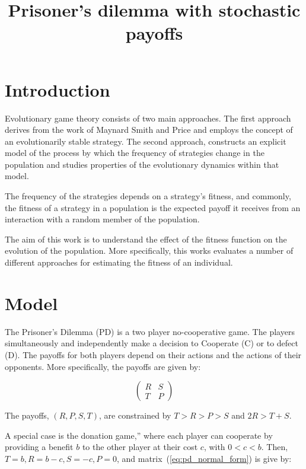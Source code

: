 \documentclass[11pt]{article}
\title{\begin{center}
\bf  \sffamily \LARGE Prisoner's dilemma with stochastic payoffs\\[-1cm]
\end{center}}
\date{}
\author{}
\theoremstyle{plainCl1}
\theoremstyle{plainCl2}
\begin{document}
\maketitle

\section{Introduction}

Evolutionary game theory consists of two main approaches. The first approach
derives from the work of Maynard Smith and Price and employs the concept of an
evolutionarily stable strategy. The second approach, constructs an explicit
model of the process by which the frequency of strategies change in the
population and studies properties of the evolutionary dynamics within that
model.

The frequency of the strategies depends on a strategy's fitness, and commonly,
the fitness of a strategy in a population is the expected payoff it receives
from an interaction with a random member of the population.

The aim of this work is to understand the effect of the fitness function on the
evolution of the population. More specifically, this works evaluates a number of
different approaches for estimating the fitness of an individual.

\section{Model}

The Prisoner's Dilemma (PD) is a two player no-cooperative game. The players
simultaneously and independently make a decision to Cooperate (C) or to defect
(D). The payoffs for both players depend on their actions and the actions of
their opponents. More specifically, the payoffs are given by:

\begin{equation}\label{eq:pd_normal_form}
    \begin{pmatrix}
        R & S  \\
        T & P
    \end{pmatrix}
\end{equation}

The payoffs, \((R, P, S, T)\), are constrained by \(T > R > P > S\) and \(2R > T + S\).

A special case is the donation game,” where each player can cooperate by providing 
a benefit \(b\) to the other player at their cost \(c\), with \(0 < c < b\).
Then, \(T=b, R=b-c, S=-c, P=0\), and matrix~(\ref{eq:pd_normal_form}) is give by:
\end{document}
